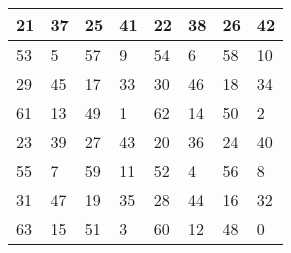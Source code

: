 \begin{tabular}{|l|l|l|l|l|l|l|l|}
\hline
21&37&25&41&22&38&26&42\\\hline
53&5&57&9&54&6&58&10\\\hline
29&45&17&33&30&46&18&34\\\hline
61&13&49&1&62&14&50&2\\\hline
23&39&27&43&20&36&24&40\\\hline
55&7&59&11&52&4&56&8\\\hline
31&47&19&35&28&44&16&32\\\hline
63&15&51&3&60&12&48&0\\\hline
\end{tabular}
